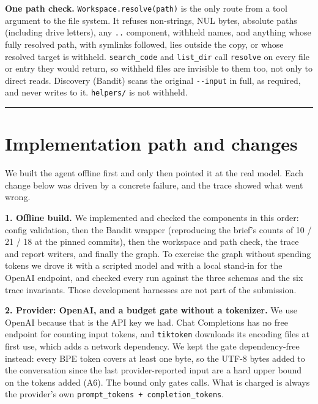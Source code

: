 \documentclass[
  10pt,
]{article}
\begin{document}
\textbf{One path check.} \texttt{Workspace.resolve(path)} is the only
route from a tool argument to the file system. It refuses non-strings,
NUL bytes, absolute paths (including drive letters), any \texttt{..}
component, withheld names, and anything whose fully resolved path, with
symlinks followed, lies outside the copy, or whose resolved target is
withheld. \texttt{search\_code} and \texttt{list\_dir} call
\texttt{resolve} on every file or entry they would return, so withheld
files are invisible to them too, not only to direct reads. Discovery
(Bandit) scans the original \texttt{-\/-input} in full, as required, and
never writes to it. \texttt{helpers/} is not withheld.

\begin{center}\rule{0.5\linewidth}{0.5pt}\end{center}

\section{Implementation path and
changes}\label{implementation-path-and-changes}

We built the agent offline first and only then pointed it at the real
model. Each change below was driven by a concrete failure, and the trace
showed what went wrong.

\textbf{1. Offline build.} We implemented and checked the components in
this order: config validation, then the Bandit wrapper (reproducing the
brief's counts of 10 / 21 / 18 at the pinned commits), then the
workspace and path check, the trace and report writers, and finally the
graph. To exercise the graph without spending tokens we drove it with a
scripted model and with a local stand-in for the OpenAI endpoint, and
checked every run against the three schemas and the six trace
invariants. Those development harnesses are not part of the submission.

\textbf{2. Provider: OpenAI, and a budget gate without a tokenizer.} We
use OpenAI because that is the API key we had. Chat Completions has no
free endpoint for counting input tokens, and \texttt{tiktoken} downloads
its encoding files at first use, which adds a network dependency. We
kept the gate dependency-free instead: every BPE token covers at least
one byte, so the UTF-8 bytes added to the conversation since the last
provider-reported input are a hard upper bound on the tokens added (A6).
The bound only gates calls. What is charged is always the provider's own
\texttt{prompt\_tokens\ +\ completion\_tokens}.
\end{document}

